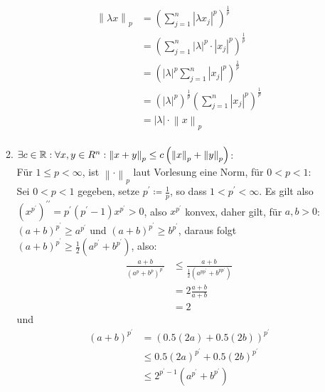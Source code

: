 \documentclass[sectionformat=aufgabe]{gadsescript}
\begin{document}
\begin{enumerate}[label=(\alph*)]
\begin{enumerate}[label=(\roman*)]
				\begin{align*}
					\left\| \lambda x \right\| _p &= \left( \sum_{j=1}^{n} \left| \lambda x_j \right| ^p \right) ^{\frac{ 1 }{ p } }  \\
								      &= \left( \sum_{j=1}^{n} \left| \lambda \right|^p \cdot \left| x_j \right| ^p \right) ^{\frac{ 1 }{ p } } \\
								      &= \left( \left| \lambda \right| ^p \sum_{j=1}^{n} \left| x_j \right| ^p \right) ^{\frac{ 1 }{ p } }  \\
								      &= \left( \left| \lambda \right| ^p \right) ^{\frac{ 1 }{ p } } \left( \sum_{j=1}^{n} \left| x_j \right| ^p \right) ^{\frac{ 1 }{ p } }  \\
								      &= \left| \lambda \right| \cdot \left\| x \right\| _p \\
				\end{align*}
			\item $ \exists c \in \mathbb{R} : \forall x, y \in R^n : \left\| x + y \right\|_p \leq c \left( \left\| x \right\| _p + \left\| y \right\| _p \right)  $:\\
				Für $ 1 \leq p < \infty $, ist $ \left\| \cdot  \right\| _p $ laut Vorlesung eine Norm, für $ 0 < p < 1 $:\\
				Sei $ 0 < p < 1 $ gegeben, setze $ p^\prime \coloneqq \frac{ 1 }{ p }  $, so dass $ 1 < p^\prime < \infty $. Es gilt also $ (x^{p^\prime } )^{\prime \prime} = p^\prime (p^\prime -1) x^{p^\prime } > 0 $, also $ x^{p^\prime }  $ konvex, daher gilt, für $ a, b > 0 $:\\
				$ ( a + b )^{p^\prime } \geq  a^{p^\prime }  $ und $ ( a + b)^{p^\prime } \geq b^{p^\prime }  $, daraus folgt $ ( a + b )^{p^\prime } \geq \frac{ 1 }{ 2 } \left( a^{p^\prime } + b^{p^\prime } \right) $, also:
				\begin{align*}
					\frac{ a + b }{ ( a^p + b^p )^{p^\prime }  } &\leq  \frac{ a + b }{ \frac{ 1 }{ 2 } \left( a^{pp^\prime } + b^{pp^\prime } \right) } \\
					&= 2 \frac{ a + b }{ a + b } \\
					&= 2
				\end{align*}
				und
				\begin{align*}
					(a + b)^{p^\prime } &= (0.5 (2a) + 0.5(2b))^{p^\prime }  \\
							    &\leq 0.5 (2a)^{p^\prime } + 0.5 (2b)^{p^\prime } \\
							    &\leq 2^{p^\prime -1} \left(a^{p^\prime } + b^{p^\prime } \right)
				\end{align*}

\end{enumerate}
\end{enumerate}
\end{document}
